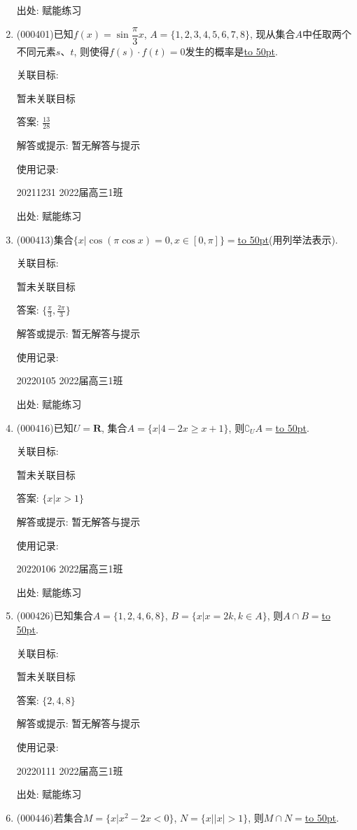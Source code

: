 \documentclass[10pt,a4paper]{article}
\newcommand{\blank}[1]{\underline{\hbox to #1pt{}}}
\begin{document}
\begin{enumerate}[1.]
出处: 赋能练习
\item { (000401)}已知$f(x)=\sin\dfrac\pi 3x$, $A=\{1,2,3,4,5,6,7,8\}$, 现从集合$A$中任取两个不同元素$s$、$t$, 则使得$f(s)\cdot f(t)=0$发生的概率是\blank{50}.


关联目标:

暂未关联目标

答案: $\frac{13}{28}$

解答或提示: 暂无解答与提示

使用记录:

20211231	2022届高三1班	


出处: 赋能练习
\item { (000413)}集合$\{x|\cos (\pi \cos x)=0,x\in [0,\pi]\}=$\blank{50}(用列举法表示).


关联目标:

暂未关联目标

答案: $\{\frac{\pi }3,\frac{2\pi }3\}$

解答或提示: 暂无解答与提示

使用记录:

20220105	2022届高三1班	


出处: 赋能练习
\item { (000416)}已知$U=\mathbf{R}$, 集合$A=\{x|4-2x\ge x+1\}$, 则${\complement_U}A=$\blank{50}.


关联目标:

暂未关联目标

答案: $\{x|x>1\}$

解答或提示: 暂无解答与提示

使用记录:

20220106	2022届高三1班	


出处: 赋能练习
\item { (000426)}已知集合$A=\{1,2,4,6,8\}$, $B=\{x|x=2k,k\in A\}$, 则$A\cap B=$\blank{50}.


关联目标:

暂未关联目标

答案: $\{2,4,8\}$

解答或提示: 暂无解答与提示

使用记录:

20220111	2022届高三1班	


出处: 赋能练习
\item { (000446)}若集合$M=\{x|{x^2}-2x<0\}$, $N=\{x||x|>1\}$, 则$M\cap N=$\blank{50}.



\end{enumerate}
\end{document}
